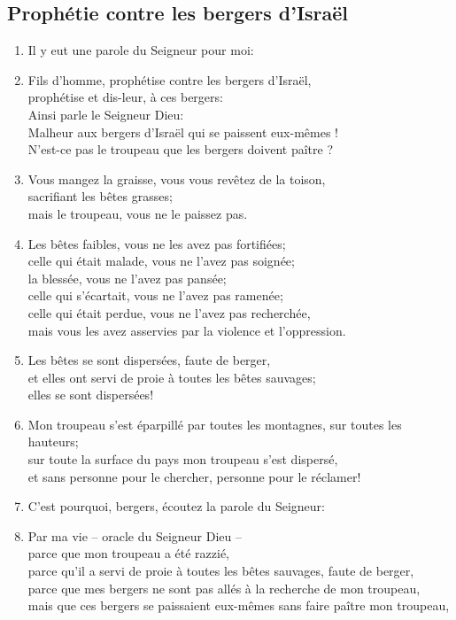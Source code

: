 \subsection*{Prophétie contre les bergers d'Israël}
\begin{enumerate}[leftmargin=\psleftmargin, labelsep = \pslabelsep, label={\arabic*}, font=\color{\pscolor}\small\textsuperscript, parsep=0em, itemsep=0em, topsep=0em ]
    \item Il y eut une parole du Seigneur pour moi:
    \item Fils d’homme, prophétise contre les bergers d’Israël, \\ prophétise et dis-leur, à ces bergers: \\ Ainsi parle le Seigneur Dieu: \\ Malheur aux bergers d’Israël qui se paissent eux-mêmes ! \\ N’est-ce pas le troupeau que les bergers doivent paître ?
    \item Vous mangez la graisse, vous vous revêtez de la toison, \\ sacrifiant les bêtes grasses; \\ mais le troupeau, vous ne le paissez pas.
    \item Les bêtes faibles, vous ne les avez pas fortifiées;\\
    celle qui était malade, vous ne l'avez pas soignée; \\ la blessée, vous ne l'avez pas pansée; \\ celle qui s’écartait, vous ne l’avez pas ramenée;\\
    celle qui était perdue, vous ne l’avez pas recherchée, \\ mais vous les avez asservies par la violence et l’oppression.
    \item Les bêtes se sont dispersées, faute de berger, \\ et elles ont servi de proie à toutes les bêtes sauvages; \\ elles se sont dispersées!
    \item Mon troupeau s’est éparpillé par toutes les montagnes, sur toutes les hauteurs; \\ sur toute la surface du pays mon troupeau s’est dispersé, \\
    et sans personne pour le chercher, personne pour le réclamer! \verseSpace
    \item C’est pourquoi, bergers, écoutez la parole du Seigneur:
    \item Par ma vie – oracle du Seigneur Dieu – \\ parce que mon troupeau a été razzié, \\ parce qu’il a servi de proie à toutes les bêtes sauvages, faute de berger, \\ parce que mes bergers ne sont pas allés à la recherche de mon troupeau, \\ mais que ces bergers se paissaient eux-mêmes sans faire paître mon troupeau,

\end{enumerate}
